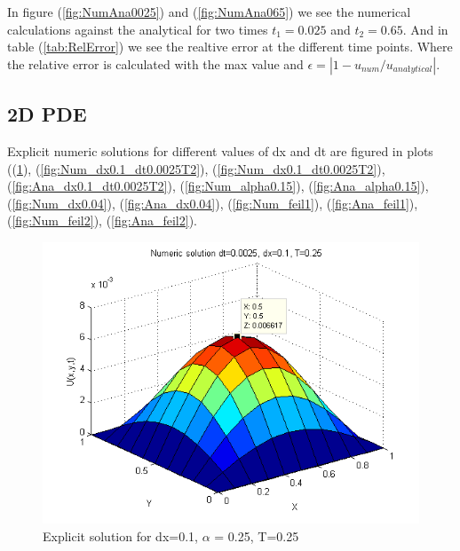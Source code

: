 \documentclass[a4paper,10pt]{article}
\begin{document}
In figure (\ref{fig:NumAna0025}) and (\ref{fig:NumAna065}) we see the numerical calculations against the analytical for two times $t_1 = 0.025$
and $t_2 = 0.65$. And in table (\ref{tab:RelError}) we see the realtive error at the different time points. Where the relative error is
calculated with the max value and $\epsilon = |1-u_{num}/u_{anałytical}|$.

\subsection{2D PDE}
Explicit numeric solutions for different values of dx and dt are figured in plots ((\ref{fig:Num_dx0.1_dt0.0025T1}), (\ref{fig:Num_dx0.1_dt0.0025T2}), (\ref{fig:Num_dx0.1_dt0.0025T2}), (\ref{fig:Ana_dx0.1_dt0.0025T2}), (\ref{fig:Num_alpha0.15}), (\ref{fig:Ana_alpha0.15}), (\ref{fig:Num_dx0.04}), (\ref{fig:Ana_dx0.04}), (\ref{fig:Num_feil1}), (\ref{fig:Ana_feil1}), (\ref{fig:Num_feil2}), (\ref{fig:Ana_feil2}).
\begin{figure}
  \begin{center}
    \includegraphics[scale=0.5]{num_dt00025_dx01_T025}
    \caption{Explicit solution for dx=0.1, $\alpha$ = 0.25, T=0.25}
    \label{fig:Num_dx0.1_dt0.0025T1}
  \end{center}

\end{figure}
\end{document}
